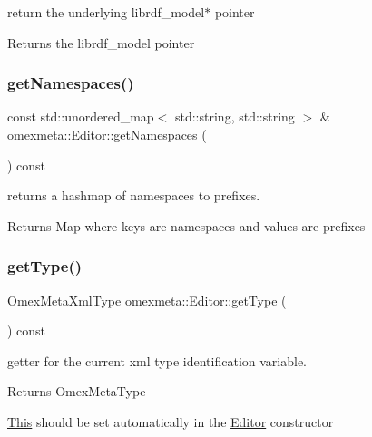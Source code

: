 return the underlying librdf\+\_\+model$\ast$ pointer 

\begin{DoxyReturn}{Returns}
the librdf\+\_\+model pointer 
\end{DoxyReturn}
\mbox{\label{classomexmeta_1_1Editor_a514443fe99a6e52154d1fe4f7ec94618}} 
\subsubsection{\texorpdfstring{get\+Namespaces()}{getNamespaces()}}
{\footnotesize\ttfamily const std\+::unordered\+\_\+map$<$ std\+::string, std\+::string $>$ \& omexmeta\+::\+Editor\+::get\+Namespaces (\begin{DoxyParamCaption}{ }\end{DoxyParamCaption}) const}



returns a hashmap of namespaces to prefixes. 

\begin{DoxyReturn}{Returns}
Map where keys are namespaces and values are prefixes 
\end{DoxyReturn}
\mbox{\label{classomexmeta_1_1Editor_a68ade6a293061a98243a3b2853e55a4b}} 
\subsubsection{\texorpdfstring{get\+Type()}{getType()}}
{\footnotesize\ttfamily Omex\+Meta\+Xml\+Type omexmeta\+::\+Editor\+::get\+Type (\begin{DoxyParamCaption}{ }\end{DoxyParamCaption}) const}



getter for the current xml type identification variable. 

\begin{DoxyReturn}{Returns}
Omex\+Meta\+Type
\end{DoxyReturn}
\hyperlink{classThis}{This} should be set automatically in the \hyperlink{classomexmeta_1_1Editor}{Editor} constructor \mbox{\label{classomexmeta_1_1Editor_ad931e829fc9f78717e0c1443c619b7d3}} 
